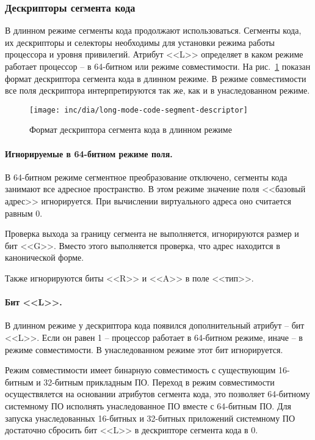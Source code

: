 \subsubsection*{Дескрипторы сегмента кода}
В длинном режиме сегменты кода продолжают использоваться. Сегменты кода, их дескрипторы и селекторы
необходимы для установки режима работы процессора и уровня привилегий. Атрибут <<L>> определяет в
каком режиме работает процессор -- в 64-битном или режиме совместимости.
На рис.~\ref{fig:long-mode-code-segment-descriptor-format} показан формат дескриптора сегмента кода
в длинном режиме. В режиме совместимости все поля дескриптора интерпретируются так же, как и в унаследованном режиме.

\begin{figure}[ht!]
  \centering
  \texttt{[image: inc/dia/long-mode-code-segment-descriptor]}
  \caption{Формат дескриптора сегмента кода в длинном режиме}
  \label{fig:long-mode-code-segment-descriptor-format}
\end{figure}

\paragraph{Игнорируемые в 64-битном режиме поля.}
В 64-битном режиме сегментное преобразование отключено, сегменты кода занимают все адресное пространство.
В этом режиме значение поля <<базовый адрес>> игнорируется. При вычислении виртуального адреса оно считается равным 0.

Проверка выхода за границу сегмента не выполняется, игнорируются размер и бит <<G>>. Вместо этого выполняется
проверка, что адрес находится в канонической форме.

Также игнорируются биты <<R>> и <<A>> в поле <<тип>>.

\paragraph{Бит <<L>>.} В длинном режиме у дескриптора кода появился дополнительный атрибут -- бит <<L>>. Если он равен 1 --
процессор работает в 64-битном режиме, иначе -- в режиме совместимости. В унаследованном режиме этот бит игнорируется.

Режим совместимости имеет бинарную совместимость с существующим 16-битным и 32-битным прикладным ПО.
Переход в режим совместимости осуществялется на основании атрибутов сегмента кода, это позволяет
64-битному системному ПО исполнять унаследованное ПО вместе с 64-битным ПО. Для запуска унаследованных
16-битных и 32-битных приложений системному ПО достаточно сбросить бит <<L>> в дескрипторе сегмента кода в 0.

